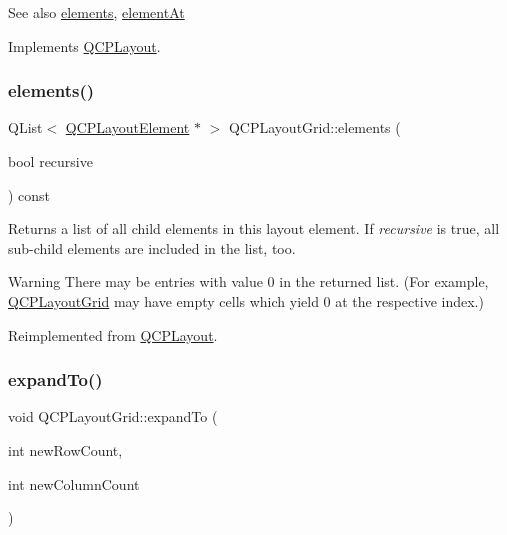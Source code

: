 \begin{DoxySeeAlso}{See also}
\hyperlink{class_q_c_p_layout_grid_a20a745d013de4c89cf5de8004a5a36f7}{elements}, \hyperlink{class_q_c_p_layout_grid_a97672ecc379cb3a09639926ba9980297}{element\+At} 
\end{DoxySeeAlso}


Implements \hyperlink{class_q_c_p_layout_a39d3e9ef5d9b82ab1885ba1cb9597e56}{Q\+C\+P\+Layout}.

\hypertarget{class_q_c_p_layout_grid_a20a745d013de4c89cf5de8004a5a36f7}{}\label{class_q_c_p_layout_grid_a20a745d013de4c89cf5de8004a5a36f7} 
\subsubsection{\texorpdfstring{elements()}{elements()}}
{\footnotesize\ttfamily Q\+List$<$ \hyperlink{class_q_c_p_layout_element}{Q\+C\+P\+Layout\+Element} $\ast$ $>$ Q\+C\+P\+Layout\+Grid\+::elements (\begin{DoxyParamCaption}\item[{bool}]{recursive }\end{DoxyParamCaption}) const\hspace{0.3cm}{\ttfamily [virtual]}}

Returns a list of all child elements in this layout element. If {\itshape recursive} is true, all sub-\/child elements are included in the list, too.

\begin{DoxyWarning}{Warning}
There may be entries with value 0 in the returned list. (For example, \hyperlink{class_q_c_p_layout_grid}{Q\+C\+P\+Layout\+Grid} may have empty cells which yield 0 at the respective index.) 
\end{DoxyWarning}


Reimplemented from \hyperlink{class_q_c_p_layout_adc9ebc73fc215f9cc22796712a251ff4}{Q\+C\+P\+Layout}.

\hypertarget{class_q_c_p_layout_grid_a886c0dcbabd51a45da399e044552b685}{}\label{class_q_c_p_layout_grid_a886c0dcbabd51a45da399e044552b685} 
\subsubsection{\texorpdfstring{expand\+To()}{expandTo()}}
{\footnotesize\ttfamily void Q\+C\+P\+Layout\+Grid\+::expand\+To (\begin{DoxyParamCaption}\item[{int}]{new\+Row\+Count,  }\item[{int}]{new\+Column\+Count }\end{DoxyParamCaption})}

